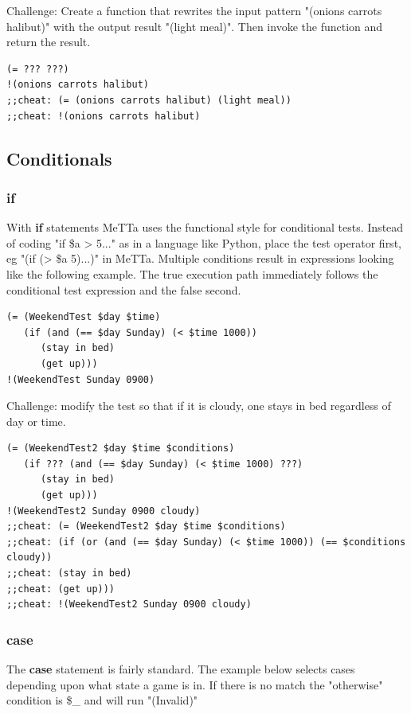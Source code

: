 \documentclass{article}
\begin{document}
Challenge: Create a function that rewrites the input pattern "(onions carrots halibut)" with the output result "(light meal)". Then invoke the function and return the result.

\begin{verbatim}
(= ??? ???)
!(onions carrots halibut)
;;cheat: (= (onions carrots halibut) (light meal))
;;cheat: !(onions carrots halibut)
\end{verbatim}

\subsection{Conditionals}

\subsubsection{if}

With \textbf{if} statements MeTTa uses the functional style for conditional tests. Instead of coding "if \$a > 5..." as in a language like Python, place the test operator first, eg "(if (> \$a 5)...)" in MeTTa.  Multiple conditions result in expressions looking like the following example. The true execution path immediately follows the conditional test expression and the false second.

\begin{verbatim}
(= (WeekendTest $day $time)
   (if (and (== $day Sunday) (< $time 1000))
      (stay in bed)
      (get up)))
!(WeekendTest Sunday 0900)
\end{verbatim}

Challenge: modify the test so that if it is cloudy, one stays in bed regardless of day or time.


\begin{verbatim}
(= (WeekendTest2 $day $time $conditions)
   (if ??? (and (== $day Sunday) (< $time 1000) ???)
      (stay in bed)
      (get up)))
!(WeekendTest2 Sunday 0900 cloudy)
;;cheat: (= (WeekendTest2 $day $time $conditions)
;;cheat: (if (or (and (== $day Sunday) (< $time 1000)) (== $conditions cloudy))
;;cheat: (stay in bed)
;;cheat: (get up)))
;;cheat: !(WeekendTest2 Sunday 0900 cloudy)
\end{verbatim}

\subsubsection{case}

The \textbf{case} statement is fairly standard. The example below selects cases depending upon what state a game is in. If there is no match the "otherwise" condition is \$_ and will run "(Invalid)"
\end{document}
